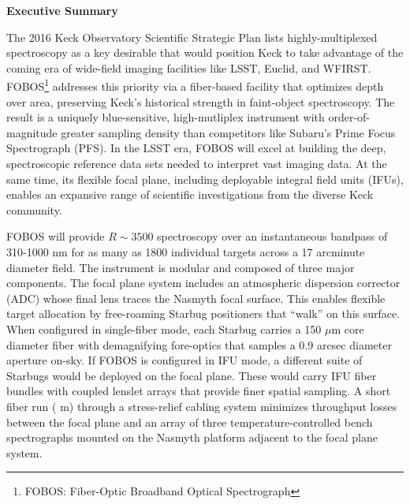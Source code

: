 
\centerline{{\large\bf Executive Summary}}


The 2016 Keck Observatory Scientific Strategic Plan lists highly-multiplexed spectroscopy as a key desirable that would
position Keck to take advantage of the coming era of wide-field imaging facilities like LSST, Euclid, and WFIRST.  FOBOS\footnote{FOBOS: Fiber-Optic Broadband Optical
Spectrograph} addresses this priority via a fiber-based facility that optimizes depth over area, preserving Keck's historical strength in faint-object spectroscopy.  The result is a uniquely blue-sensitive, high-mutliplex instrument with order-of-magnitude greater sampling density than competitors like Subaru's Prime Focus Spectrograph (PFS).  In the LSST era, FOBOS will excel at building the deep, spectroscopic reference data sets needed to interpret vast imaging data.  At the same time, its flexible focal plane, including deployable integral field units (IFUs), enables an expansive range of scientific investigations from the diverse Keck community.

FOBOS will provide $R \sim 3500$ spectroscopy over an instantaneous bandpass of 310-1000 nm for as many as 1800
individual targets across a 17 arcminute diameter field.  The instrument is modular and composed of three major
components.  The focal plane system includes an atmospheric dispersion corrector (ADC) whose final lens traces the
Nasmyth focal surface.  This enables flexible target allocation by free-roaming Starbug positioners that ``walk'' on
this surface.  When configured in single-fiber mode, each Starbug carries a 150 $\mu$m core diameter fiber with
demagnifying fore-optics that samples a 0.9 arcsec diameter aperture on-sky.  If FOBOS is configured in IFU mode, a
different suite of Starbugs would be deployed on the focal plane.  These would carry IFU fiber bundles with coupled
lenslet arrays that provide finer spatial sampling.  A short fiber run ( m) through a stress-relief cabling system
minimizes throughput losses between the focal plane and an array of three temperature-controlled bench spectrographs
mounted on the Nasmyth platform adjacent to the focal plane system.

